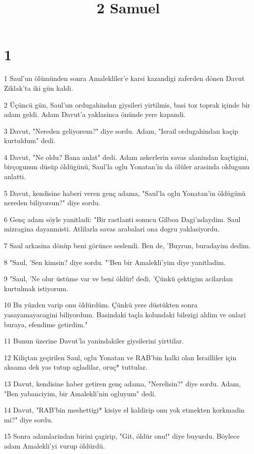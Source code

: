 

\title{2 Samuel}


\chapter{1}

\par 1 Saul'un ölümünden sonra Amalekliler'e karsi kazandigi zaferden dönen Davut Ziklak'ta iki gün kaldi.
\par 2 Üçüncü gün, Saul'un ordugahindan giysileri yirtilmis, basi toz toprak içinde bir adam geldi. Adam Davut'a yaklasinca önünde yere kapandi.
\par 3 Davut, "Nereden geliyorsun?" diye sordu. Adam, "Israil ordugahindan kaçip kurtuldum" dedi.
\par 4 Davut, "Ne oldu? Bana anlat" dedi. Adam askerlerin savas alanindan kaçtigini, birçogunun düsüp öldügünü, Saul'la oglu Yonatan'in da ölüler arasinda oldugunu anlatti.
\par 5 Davut, kendisine haberi veren genç adama, "Saul'la oglu Yonatan'in öldügünü nereden biliyorsun?" diye sordu.
\par 6 Genç adam söyle yanitladi: "Bir rastlanti sonucu Gilboa Dagi'ndaydim. Saul mizragina dayanmisti. Atlilarla savas arabalari ona dogru yaklasiyordu.
\par 7 Saul arkasina dönüp beni görünce seslendi. Ben de, 'Buyrun, buradayim dedim.
\par 8 "Saul, 'Sen kimsin? diye sordu. "'Ben bir Amalekli'yim diye yanitladim.
\par 9 "Saul, 'Ne olur üstüme var ve beni öldür! dedi, 'Çünkü çektigim acilardan kurtulmak istiyorum.
\par 10 Bu yüzden varip onu öldürdüm. Çünkü yere düstükten sonra yasayamayacagini biliyordum. Basindaki taçla kolundaki bilezigi aldim ve onlari buraya, efendime getirdim."
\par 11 Bunun üzerine Davut'la yanindakiler giysilerini yirttilar.
\par 12 Kiliçtan geçirilen Saul, oglu Yonatan ve RAB'bin halki olan Israilliler için aksama dek yas tutup agladilar, oruç* tuttular.
\par 13 Davut, kendisine haber getiren genç adama, "Nerelisin?" diye sordu. Adam, "Ben yabanciyim, bir Amalekli'nin ogluyum" dedi.
\par 14 Davut, "RAB'bin meshettigi* kisiye el kaldirip onu yok etmekten korkmadin mi?" diye sordu.
\par 15 Sonra adamlarindan birini çagirip, "Git, öldür onu!" diye buyurdu. Böylece adam Amalekli'yi vurup öldürdü.
